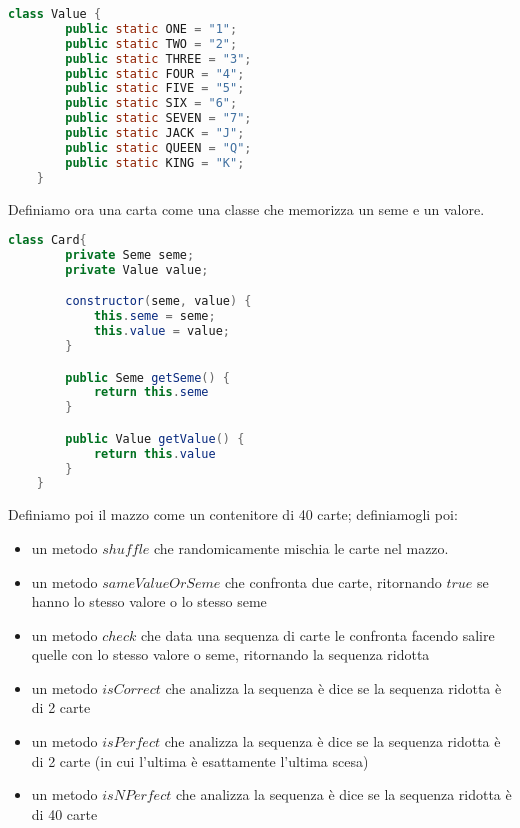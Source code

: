 \documentclass[a4paper]{article}
\begin{document}
\begin{lstlisting}[language=Java]
    class Value {
        public static ONE = "1";
        public static TWO = "2";
        public static THREE = "3";
        public static FOUR = "4";
        public static FIVE = "5";
        public static SIX = "6";
        public static SEVEN = "7";
        public static JACK = "J";
        public static QUEEN = "Q";
        public static KING = "K";
    }
\end{lstlisting}

\vspace{0.5cm}
\noindent
Definiamo ora una carta come una classe che memorizza un seme e un valore.

\begin{lstlisting}[language=Java]
    class Card{
        private Seme seme;
        private Value value;

        constructor(seme, value) {
            this.seme = seme;
            this.value = value;
        }

        public Seme getSeme() {
            return this.seme
        }

        public Value getValue() {
            return this.value
        }
    }
\end{lstlisting}

\vspace{0.5cm}
\noindent
Definiamo poi il mazzo come un contenitore di 40 carte; definiamogli poi:
\begin{itemize}
    \item un metodo $shuffle$ che randomicamente mischia le carte nel mazzo.
    \item un metodo $sameValueOrSeme$ che confronta due carte, ritornando $true$ se hanno lo stesso valore o lo stesso seme
    \item un metodo $check$ che data una sequenza di carte le confronta facendo salire quelle con lo stesso valore o seme, ritornando la sequenza ridotta
    \item un metodo $isCorrect$ che analizza la sequenza è dice se la sequenza ridotta è di 2 carte
    \item un metodo $isPerfect$ che analizza la sequenza è dice se la sequenza ridotta è di 2 carte (in cui l'ultima è esattamente l'ultima scesa)
    \item un metodo $isNPerfect$ che analizza la sequenza è dice se la sequenza ridotta è di 40 carte
\end{itemize}
\end{document}
